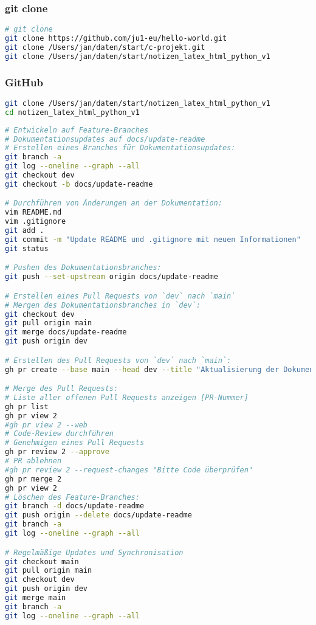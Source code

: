 \documentclass{vorlage-design-main}
\begin{document}
\hypertarget{git-clone}{%
\subsubsection{git clone}\label{git-clone}}

\begin{lstlisting}[language=bash]
# git clone
git clone https://github.com/ju1-eu/hello-world.git
git clone /Users/jan/daten/start/c-projekt.git
git clone /Users/jan/daten/start/notizen_latex_html_python_v1
\end{lstlisting}

\hypertarget{github}{%
\subsubsection{GitHub}\label{github}}

\begin{lstlisting}[language=bash]
git clone /Users/jan/daten/start/notizen_latex_html_python_v1
cd notizen_latex_html_python_v1
\end{lstlisting}

\begin{lstlisting}[language=bash]
# Entwickeln auf Feature-Branches
# Dokumentationsupdates auf docs/update-readme
# Erstellen eines Branches für Dokumentationsupdates:
git branch -a
git log --oneline --graph --all
git checkout dev
git checkout -b docs/update-readme

# Durchführen von Änderungen an der Dokumentation:
vim README.md
vim .gitignore
git add .
git commit -m "Update README und .gitignore mit neuen Informationen"
git status

# Pushen des Dokumentationsbranches:
git push --set-upstream origin docs/update-readme

# Erstellen eines Pull Requests von `dev` nach `main`
# Mergen des Dokumentationsbranches in `dev`:
git checkout dev
git pull origin main
git merge docs/update-readme
git push origin dev

# Erstellen des Pull Requests von `dev` nach `main`:
gh pr create --base main --head dev --title "Aktualisierung der Dokumentation" --body "Fügt detaillierte Informationen zur README hinzu."

# Merge des Pull Requests:
# Liste aller offenen Pull Requests anzeigen [PR-Nummer]
gh pr list
gh pr view 2
#gh pr view 2 --web
# Code-Review durchführen
# Genehmigen eines Pull Requests
gh pr review 2 --approve
# PR ablehnen
#gh pr review 2 --request-changes "Bitte Code überprüfen"
gh pr merge 2
gh pr view 2
# Löschen des Feature-Branches:
git branch -d docs/update-readme
git push origin --delete docs/update-readme
git branch -a
git log --oneline --graph --all

# Regelmäßige Updates und Synchronisation
git checkout main
git pull origin main
git checkout dev
git push origin dev
git merge main
git branch -a
git log --oneline --graph --all
\end{lstlisting}
\end{document}
